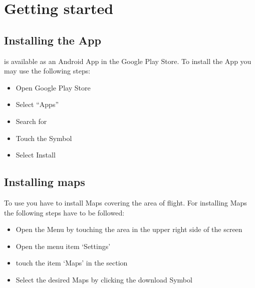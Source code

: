 \documentclass[letterpaper,10pt,english]{sphinxmanual}
\begin{document}
\chapter{Getting started}
\label{\detokenize{01-intro/getting_started:getting-started}}\label{\detokenize{01-intro/getting_started::doc}}

\section{Installing the App}
\label{\detokenize{01-intro/getting_started:installing-the-app}}
\sphinxAtStartPar
{} is available as an Android App in the Google Play
Store.  To install the App  you may use the
following steps:
\begin{itemize}
\item {} 
\sphinxAtStartPar
Open Google Play Store

\item {} 
\sphinxAtStartPar
Select “Apps”

\item {} 
\sphinxAtStartPar
Search for 

\item {} 
\sphinxAtStartPar
Touch the Symbol

\item {} 
\sphinxAtStartPar
Select Install

\end{itemize}


\section{Installing maps}
\label{\detokenize{01-intro/getting_started:installing-maps}}
\sphinxAtStartPar
To use  you have to install Maps covering the area
of flight.  For installing Maps the following steps have to be followed:
\begin{itemize}
\item {} 
\sphinxAtStartPar
Open the Menu by touching the area in the upper right side of the screen

\item {} 
\sphinxAtStartPar
Open the menu item ‘Settings’

\item {} 
\sphinxAtStartPar
touch the item ‘Maps’ in the  section

\item {} 
\sphinxAtStartPar
Select the desired Maps by clicking the download Symbol

\end{itemize}
\end{document}
